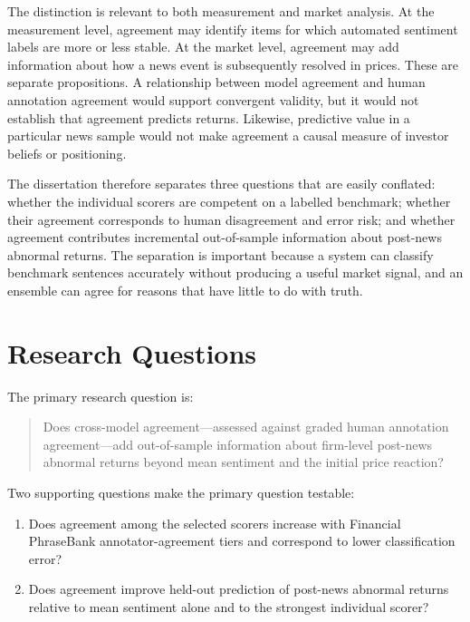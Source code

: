\documentclass[11pt,a4paper,oneside]{book}
\begin{document}
The distinction is relevant to both measurement and market analysis.
At the measurement level, agreement may identify items for which automated sentiment labels are more or less stable.
At the market level, agreement may add information about how a news event is subsequently resolved in prices.
These are separate propositions.
A relationship between model agreement and human annotation agreement would support convergent validity, but it would not establish that agreement predicts returns.
Likewise, predictive value in a particular news sample would not make agreement a causal measure of investor beliefs or positioning.

The dissertation therefore separates three questions that are easily conflated: whether the individual scorers are competent on a labelled benchmark; whether their agreement corresponds to human disagreement and error risk; and whether agreement contributes incremental out-of-sample information about post-news abnormal returns.
The separation is important because a system can classify benchmark sentences accurately without producing a useful market signal, and an ensemble can agree for reasons that have little to do with truth.

\section{Research Questions}
\label{sec:research-questions}

The primary research question is:

\begin{quote}\raggedright
Does cross-model agreement---assessed against graded human annotation agreement---add out-of-sample information about firm-level post-news abnormal returns beyond mean sentiment and the initial price reaction?
\end{quote}

Two supporting questions make the primary question testable:

\begin{enumerate}[label=\textbf{SQ\arabic*:}]
  \item Does agreement among the selected scorers increase with Financial PhraseBank annotator-agreement tiers and correspond to lower classification error?
  \item Does agreement improve held-out prediction of post-news abnormal returns relative to mean sentiment alone and to the strongest individual scorer?
\end{enumerate}
\end{document}
